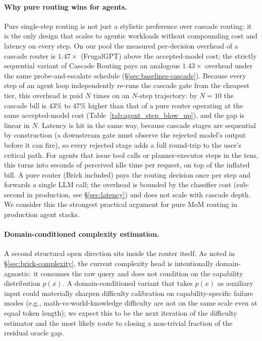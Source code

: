 \documentclass[twocolumn,10pt,a4paper]{article}
\begin{document}
\paragraph{Why pure routing wins for agents.}\label{sec:agentic-discussion} Pure single-step routing is not just a stylistic preference over cascade routing: it is the only design that scales to agentic workloads without compounding cost and latency on every step. On our pool the measured per-decision overhead of a cascade router is $1.47\times$ (FrugalGPT) above the accepted-model cost; the strictly sequential variant of Cascade Routing pays an analogous $1.43\times$ overhead under the same probe-and-escalate schedule (§\ref{sec:baselines-cascade}). Because every step of an agent loop independently re-runs the cascade gate from the cheapest tier, this overhead is paid $N$ times on an $N$-step trajectory: by $N{=}10$ the cascade bill is $43\%$ to $47\%$ higher than that of a pure router operating at the same accepted-model cost (Table~\ref{tab:agent_step_blow_up}), and the gap is linear in $N$. Latency is hit in the same way, because cascade stages are sequential by construction (a downstream gate must observe the rejected model's output before it can fire), so every rejected stage adds a full round-trip to the user's critical path. For agents that issue tool calls or planner-executor steps in the tens, this turns into seconds of perceived idle time per request, on top of the inflated bill. A pure router (Brick included) pays the routing decision once per step and forwards a single LLM call; the overhead is bounded by the classifier cost (sub-second in production, see §\ref{sec:latency}) and does not scale with cascade depth. We consider this the strongest practical argument for pure MoM routing in production agent stacks.

\paragraph{Domain-conditioned complexity estimation.} A second structural open direction sits inside the router itself. As noted in §\ref{sec:brick-complexity}, the current complexity head is intentionally domain-agnostic: it consumes the raw query and does not condition on the capability distribution $p(x)$. A domain-conditioned variant that takes $p(x)$ as auxiliary input could materially sharpen difficulty calibration on capability-specific failure modes (e.g., math-vs-world-knowledge difficulty are not on the same scale even at equal token length); we expect this to be the next iteration of the difficulty estimator and the most likely route to closing a non-trivial fraction of the residual oracle gap.
\end{document}
